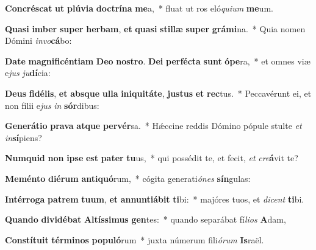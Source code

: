 \item \textbf{Con}\textbf{crés}\textbf{cat} \textbf{ut} \textbf{plú}\textbf{vi}\textbf{a} \textbf{doc}\textbf{trí}\textbf{na} \textbf{me}a,~* fluat ut ros eló\textit{qui}\textit{um} \textbf{me}um.
\item \textbf{Qua}\textbf{si} \textbf{im}\textbf{ber} \textbf{su}\textbf{per} \textbf{her}\textbf{bam}, \textbf{et} \textbf{qua}\textbf{si} \textbf{stil}\textbf{læ} \textbf{su}\textbf{per} \textbf{grá}\textbf{mi}na.~* Quia nomen Dómini \textit{in}\textit{vo}\textbf{cá}bo:
\item \textbf{Da}\textbf{te} \textbf{ma}\textbf{gni}\textbf{fi}\textbf{cén}\textbf{ti}\textbf{am} \textbf{De}\textbf{o} \textbf{nos}\textbf{tro}. \textbf{De}\textbf{i} \textbf{per}\textbf{féc}\textbf{ta} \textbf{sunt} \textbf{ó}\textbf{pe}ra,~* et omnes viæ e\textit{jus} \textit{ju}\textbf{dí}cia:
\item \textbf{De}\textbf{us} \textbf{fi}\textbf{dé}\textbf{lis}, \textbf{et} \textbf{abs}\textbf{que} \textbf{ul}\textbf{la} \textbf{in}\textbf{i}\textbf{qui}\textbf{tá}\textbf{te}, \textbf{jus}\textbf{tus} \textbf{et} \textbf{rec}tus.~* Peccavérunt ei, et non fílii e\textit{jus} \textit{in} \textbf{sór}dibus:
\item \textbf{Ge}\textbf{ne}\textbf{rá}\textbf{ti}\textbf{o} \textbf{pra}\textbf{va} \textbf{at}\textbf{que} \textbf{per}\textbf{vér}sa.~* Hǽccine reddis Dómino pópule stulte \textit{et} \textit{in}\textbf{sí}piens?
\item \textbf{Num}\textbf{quid} \textbf{non} \textbf{ip}\textbf{se} \textbf{est} \textbf{pa}\textbf{ter} \textbf{tu}us,~* qui possédit te, et fecit, \textit{et} \textit{cre}\textbf{á}vit te?
\item \textbf{Me}\textbf{mén}\textbf{to} \textbf{di}\textbf{é}\textbf{rum} \textbf{an}\textbf{ti}\textbf{quó}rum,~* cógita generati\textit{ó}\textit{nes} \textbf{sín}gulas:
\item \textbf{In}\textbf{tér}\textbf{ro}\textbf{ga} \textbf{pa}\textbf{trem} \textbf{tu}\textbf{um}, \textbf{et} \textbf{an}\textbf{nun}\textbf{ti}\textbf{á}\textbf{bit} \textbf{ti}bi:~* majóres tuos, et \textit{di}\textit{cent} \textbf{ti}bi.
\item \textbf{Quan}\textbf{do} \textbf{di}\textbf{vi}\textbf{dé}\textbf{bat} \textbf{Al}\textbf{tís}\textbf{si}\textbf{mus} \textbf{gen}tes:~* quando separábat fí\textit{li}\textit{os} \textbf{A}dam,
\item \textbf{Con}\textbf{stí}\textbf{tu}\textbf{it} \textbf{tér}\textbf{mi}\textbf{nos} \textbf{po}\textbf{pu}\textbf{ló}rum~* juxta númerum fili\textit{ó}\textit{rum} \textbf{Is}raël.
